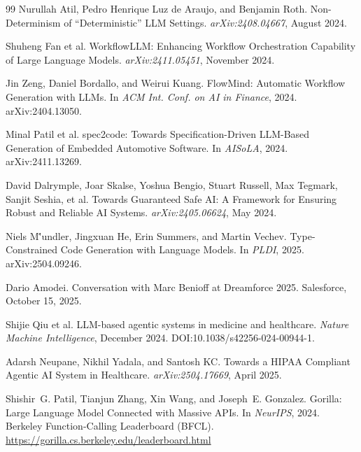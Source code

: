\documentclass[11pt]{article}
\begin{document}
\begin{thebibliography}{99}
Nurullah Atil, Pedro Henrique Luz de Araujo, and Benjamin Roth.
\newblock Non-Determinism of ``Deterministic'' LLM Settings.
\newblock \emph{arXiv:2408.04667}, August 2024.

Shuheng Fan et al.
\newblock WorkflowLLM: Enhancing Workflow Orchestration Capability of Large Language Models.
\newblock \emph{arXiv:2411.05451}, November 2024.

Jin Zeng, Daniel Bordallo, and Weirui Kuang.
\newblock FlowMind: Automatic Workflow Generation with LLMs.
\newblock In \emph{ACM Int. Conf. on AI in Finance}, 2024.
\newblock arXiv:2404.13050.

Minal Patil et al.
\newblock spec2code: Towards Specification-Driven LLM-Based Generation of Embedded Automotive Software.
\newblock In \emph{AISoLA}, 2024.
\newblock arXiv:2411.13269.

David Dalrymple, Joar Skalse, Yoshua Bengio, Stuart Russell, Max Tegmark, Sanjit Seshia, et al.
\newblock Towards Guaranteed Safe AI: A Framework for Ensuring Robust and Reliable AI Systems.
\newblock \emph{arXiv:2405.06624}, May 2024.

Niels M\''{u}ndler, Jingxuan He, Erin Summers, and Martin Vechev.
\newblock Type-Constrained Code Generation with Language Models.
\newblock In \emph{PLDI}, 2025.
\newblock arXiv:2504.09246.

Dario Amodei.
\newblock Conversation with Marc Benioff at Dreamforce 2025.
\newblock Salesforce, October 15, 2025.

Shijie Qiu et al.
\newblock LLM-based agentic systems in medicine and healthcare.
\newblock \emph{Nature Machine Intelligence}, December 2024.
\newblock DOI:10.1038/s42256-024-00944-1.

Adarsh Neupane, Nikhil Yadala, and Santosh KC.
\newblock Towards a HIPAA Compliant Agentic AI System in Healthcare.
\newblock \emph{arXiv:2504.17669}, April 2025.

Shishir~G. Patil, Tianjun Zhang, Xin Wang, and Joseph~E. Gonzalez.
\newblock Gorilla: Large Language Model Connected with Massive APIs.
\newblock In \emph{NeurIPS}, 2024.
\newblock Berkeley Function-Calling Leaderboard (BFCL).
\newblock \url{https://gorilla.cs.berkeley.edu/leaderboard.html}

\end{thebibliography}
\end{document}
